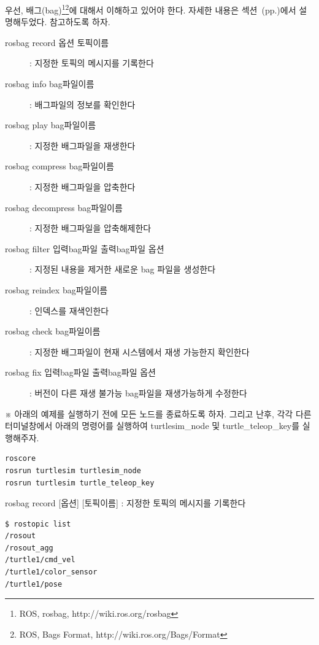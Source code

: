 우선, 배그(bag)\footnote{ROS, rosbag, http://wiki.ros.org/rosbag}\footnote{ROS, Bags Format, http://wiki.ros.org/Bags/Format}에 대해서 이해하고 있어야 한다. 자세한 내용은 섹션~(pp.\pageref{def:RosBag})에서 설명해두었다. 참고하도록 하자.

\vspace{\baselineskip}
\noindent
\begin{description}
\item[rosbag record 옵션 토픽이름] : 지정한 토픽의 메시지를 기록한다
\item[rosbag info bag파일이름] : 배그파일의 정보를 확인한다
\item[rosbag play bag파일이름] : 지정한 배그파일을 재생한다

\item[rosbag compress bag파일이름] : 지정한 배그파일을 압축한다
\item[rosbag decompress bag파일이름] : 지정한 배그파일을 압축해제한다

\item[rosbag filter 입력bag파일 출력bag파일 옵션] : 지정된 내용을 제거한 새로운 bag 파일을 생성한다
\item[rosbag reindex bag파일이름] : 인덱스를 재색인한다

\item[rosbag check bag파일이름] : 지정한 배그파일이 현재 시스템에서 재생 가능한지 확인한다
\item[rosbag fix 입력bag파일 출력bag파일 옵션] : 버전이 다른 재생 불가능 bag파일을 재생가능하게 수정한다
\end{description}

\vspace{\baselineskip}
\noindent
※ 아래의 예제를 실행하기 전에 모든 노드를 종료하도록 하자. 그리고 난후, 각각 다른 터미널창에서 아래의 명령어를 실행하여 turtlesim\_node 및 turtle\_teleop\_key를 실행해주자.

\vspace{\baselineskip}
\begin{lstlisting}[language=ROS]
roscore
rosrun turtlesim turtlesim_node 
rosrun turtlesim turtle_teleop_key
\end{lstlisting}

\setcounter{num}{0}

\noindent
{}\circled{\thenum} rosbag record [옵션] [토픽이름] : 지정한 토픽의 메시지를 기록한다

\begin{lstlisting}[language=ROS]
$ rostopic list
/rosout
/rosout_agg
/turtle1/cmd_vel
/turtle1/color_sensor
/turtle1/pose
\end{lstlisting}

